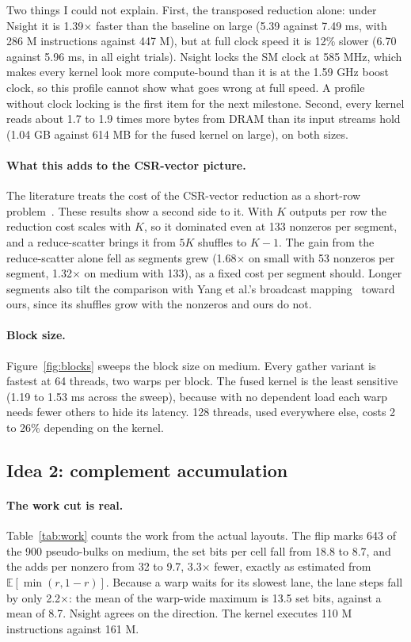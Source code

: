 Two things I could not explain. First, the transposed reduction alone: under Nsight it is 1.39$\times$
faster than the baseline on large (5.39 against 7.49 ms, with 286 M instructions against 447 M), but at full
clock speed it is 12\% slower (6.70 against 5.96 ms, in all eight trials). Nsight locks the SM clock at
585 MHz, which makes every kernel look more compute-bound than it is at the 1.59 GHz boost clock, so this
profile cannot show what goes wrong at full speed. A profile without clock locking is the first item for
the next milestone. Second, every kernel reads about 1.7 to 1.9 times more bytes from DRAM than its input
streams hold (1.04 GB against 614 MB for the fused kernel on large), on both sizes.

\paragraph{What this adds to the CSR-vector picture.} The literature treats the cost of the CSR-vector
reduction as a short-row problem~\cite{bell2009,greathouse2014}. These results show a second side to it.
With $K$ outputs per row the reduction cost scales with $K$, so it dominated even at 133 nonzeros per
segment, and a reduce-scatter brings it from $5K$ shuffles to $K-1$. The gain from the reduce-scatter alone fell as segments grew (1.68$\times$ on small with 53 nonzeros per
segment, 1.32$\times$ on medium with 133), as a fixed cost per segment should. Longer segments also tilt
the comparison with Yang et al.'s broadcast mapping~\cite{yang2018} toward ours, since its shuffles grow
with the nonzeros and ours do not.

\paragraph{Block size.} Figure~\ref{fig:blocks} sweeps the block size on medium. Every gather variant is
fastest at 64 threads, two warps per block. The fused kernel is the least sensitive (1.19 to 1.53 ms
across the sweep), because with no dependent load each warp needs fewer others to hide its latency.
128 threads, used everywhere else, costs 2 to 26\% depending on the kernel.

\subsection{Idea 2: complement accumulation}

\paragraph{The work cut is real.} Table~\ref{tab:work} counts the work from the actual layouts. The
flip marks 643 of the 900 pseudo-bulks on medium, the set bits per cell fall from 18.8 to 8.7, and the
adds per nonzero from 32 to 9.7, 3.3$\times$ fewer, exactly as estimated from $\mathbb{E}[\min(r,1-r)]$.
Because a warp waits for its slowest lane, the lane steps fall by only 2.2$\times$: the mean of the
warp-wide maximum is 13.5 set bits, against a mean of 8.7. Nsight agrees on the direction. The kernel
executes 110 M instructions against 161 M.

